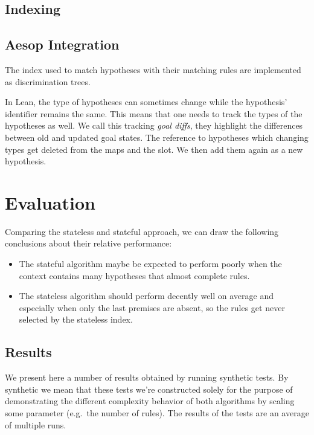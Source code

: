 \documentclass[runningheads]{llncs}
\newcommand{\xcom}[1]{{\color{cyan}{Xavier: #1}} }
\begin{document}
\subsection{Indexing}

\subsection{Aesop Integration}

\xcom{Here are some notes about the implementation.}
The index used to match hypotheses with their matching rules are implemented as discrimination trees.

\xcom{Incrementality?}
In Lean, the type of hypotheses can sometimes change while the hypothesis' identifier remains the same.
This means that one needs to track the types of the hypotheses as well.
We call this tracking \textit{goal diffs}, they highlight the differences between old and updated goal states.
The reference to hypotheses which changing types get deleted from the maps and the slot.
We then add them again as a new hypothesis.

\xcom{precompilation}

\section{Evaluation}

Comparing the stateless and stateful approach, we can draw the following conclusions about their relative performance:

\begin{itemize}
    \item The stateful algorithm maybe be expected to perform poorly when the context contains many hypotheses that almost complete rules.
    \item The stateless algorithm should perform decently well on average and especially when only the last premises are absent, so the rules get never selected by the stateless index.
\end{itemize}

\subsection{Results}
\xcom{TODO: Add a comment on the effect it had on Mathlib.}

We present here a number of results obtained by running synthetic tests.
By synthetic we mean that these tests we're constructed solely for the purpose of demonstrating the different complexity behavior of both algorithms by scaling some parameter (e.g.\ the number of rules).
The results of the tests are an average of multiple runs.
\end{document}
